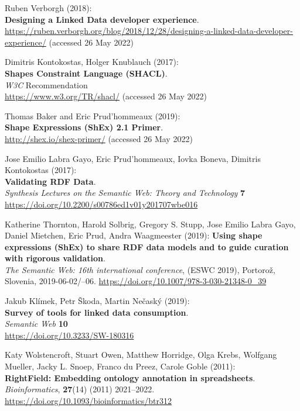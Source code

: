 \begin{thebibliography}{9}
Ruben Verborgh (2018): \\
\textbf{Designing a {Linked Data} developer experience}.\\
\url{https://ruben.verborgh.org/blog/2018/12/28/designing-a-linked-data-developer-experience/}
(accessed 26 May 2022)

Dimitris Kontokostas, Holger Knublauch (2017):\\
\textbf{Shapes {Constraint Language} ({SHACL})}.\\
\emph{W3C} Recommendation\\
\url{https://www.w3.org/TR/shacl/} (accessed 26 May 2022)

Thomas Baker and Eric Prud'hommeaux (2019): \\
\textbf{Shape {Expressions} ({ShEx}) 2.1 {Primer}}. \\
\url{http://shex.io/shex-primer/} (accessed 26 May 2022)

Jose Emilio Labra Gayo, Eric Prud'hommeaux, Iovka Boneva, Dimitris
Kontokostas (2017): \\
\textbf{Validating {RDF Data}}. \\
\emph{Synthesis Lectures on the Semantic Web: Theory and Technology} \textbf{7} \\
\url{https://doi.org/10.2200/s00786ed1v01y201707wbe016}

Katherine Thornton, Harold Solbrig, Gregory S. Stupp, Jose Emilio Labra
Gayo, Daniel Mietchen, Eric Prud, Andra Waagmeester (2019):
\textbf{Using shape expressions ({ShEx}) to share {RDF} data models and
to guide curation with rigorous validation}. \\
\emph{The Semantic Web: 16th international conference}, (ESWC 2019), Portorož, Slovenia,
2019-06-02/--06.
\url{https://doi.org/10.1007/978-3-030-21348-0_39}

Jakub Klímek, Petr Škoda, Martin Nečaský (2019): \\
\textbf{Survey of tools for linked data consumption}. \\
\emph{Semantic Web} \textbf{10} \\
\url{https://doi.org/10.3233/SW-180316}

Katy Wolstencroft, Stuart Owen, Matthew Horridge, Olga Krebs, Wolfgang Mueller, Jacky L. Snoep, Franco du Preez, Carole Goble (2011): \\
\textbf{RightField: Embedding ontology annotation in spreadsheets}. \\
\emph{Bioinformatics}, \textbf{27}(14) (2011)
2021--2022.
\url{https://doi.org/10.1093/bioinformatics/btr312}


\end{thebibliography}
